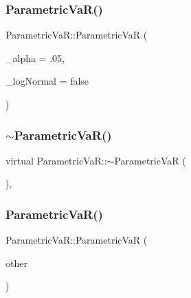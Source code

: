 \subsubsection{\texorpdfstring{Parametric\+Va\+R()}{ParametricVaR()}\hspace{0.1cm}{\footnotesize\ttfamily [1/2]}}
{\footnotesize\ttfamily Parametric\+Va\+R\+::\+Parametric\+VaR (\begin{DoxyParamCaption}\item[{double}]{\+\_\+alpha = {\ttfamily .05},  }\item[{bool}]{\+\_\+log\+Normal = {\ttfamily false} }\end{DoxyParamCaption})}

\hypertarget{classParametricVaR_a9345f4d02e6f1facb29922d2c4be504c}{}\label{classParametricVaR_a9345f4d02e6f1facb29922d2c4be504c} 
\subsubsection{\texorpdfstring{$\sim$\+Parametric\+Va\+R()}{~ParametricVaR()}}
{\footnotesize\ttfamily virtual Parametric\+Va\+R\+::$\sim$\+Parametric\+VaR (\begin{DoxyParamCaption}{ }\end{DoxyParamCaption})\hspace{0.3cm}{\ttfamily [inline]}, {\ttfamily [virtual]}}

\hypertarget{classParametricVaR_aa028595da1c747f5c1887eb07157139a}{}\label{classParametricVaR_aa028595da1c747f5c1887eb07157139a} 
\subsubsection{\texorpdfstring{Parametric\+Va\+R()}{ParametricVaR()}\hspace{0.1cm}{\footnotesize\ttfamily [2/2]}}
{\footnotesize\ttfamily Parametric\+Va\+R\+::\+Parametric\+VaR (\begin{DoxyParamCaption}\item[{const \hyperlink{classParametricVaR}{Parametric\+VaR} \&}]{other }\end{DoxyParamCaption})}




